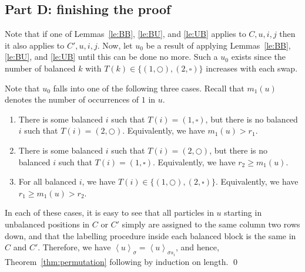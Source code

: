\documentclass[reqno]{amsart}
\newcommand{\0}{\phantom{c}}
\newcommand{\swt}[1]{\left\langle #1 \right\rangle} %
\theoremstyle{plain}
\theoremstyle{definition}
\numberwithin{equation}{section}
\begin{document}
\subsection*{Part D: finishing the proof}

Note that if one of Lemmas~\ref{le:BB}, \ref{le:BU}, and \ref{le:UB} applies to $C,u,i,j$ then it also applies to $C',u,i,j$.
Now, let $u_0$ be a result of applying Lemmas~\ref{le:BB}, \ref{le:BU}, and \ref{le:UB} until this can be done no more.
Such a $u_0$ exists since the number of balanced $k$ with $T(k) \in \{(1,\bigcirc), (2,\square)\}$ increases with each swap.

Note that $u_0$ falls into one of the following three cases.
Recall that $m_1(u)$ denotes the number of occurrences of $1$ in $u$.
\begin{enumerate}
\item There is some balanced $i$ such that $T(i) = (1, \square)$, but there is no balanced $i$ such that $T(i) = (2,\bigcirc)$.
  Equivalently, we have $m_1(u) > r_1$.
\item There is some balanced $i$ such that $T(i) = (2, \bigcirc)$, but there is no balanced $i$ such that $T(i) = (1,\square)$.
  Equivalently, we have $r_2 \geq m_1(u)$.
\item For all balanced $i$, we have $T(i) \in \{(1,\bigcirc),(2,\square)\}$.
  Equivalently, we have $r_1 \geq m_1(u) > r_2$.
\end{enumerate}
In each of these cases, it is easy to see that all particles in $u$ starting in unbalanced positions in $C$ or $C'$ simply are assigned to the same column two rows down, and that the labelling procedure inside each balanced block is the same in $C$ and $C'$.
Therefore, we have $\swt{u}_{\sigma} = \swt{u}_{\sigma s_i}$, and hence, Theorem~\ref{thm:permutation} following by induction on length.
\qed
\end{document}
